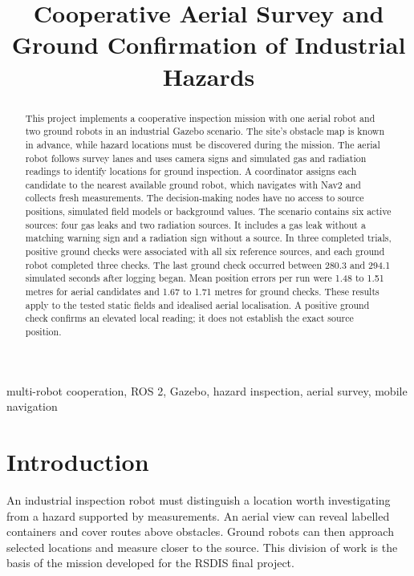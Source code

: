 \documentclass[conference]{IEEEtran}
\begin{document}
\title{Cooperative Aerial Survey and Ground Confirmation of Industrial Hazards}
\author{
}
\maketitle

\begin{abstract}
This project implements a cooperative inspection mission with one aerial robot and two ground robots in an industrial Gazebo scenario. The site's obstacle map is known in advance, while hazard locations must be discovered during the mission. The aerial robot follows survey lanes and uses camera signs and simulated gas and radiation readings to identify locations for ground inspection. A coordinator assigns each candidate to the nearest available ground robot, which navigates with Nav2 and collects fresh measurements. The decision-making nodes have no access to source positions, simulated field models or background values. The scenario contains six active sources: four gas leaks and two radiation sources. It includes a gas leak without a matching warning sign and a radiation sign without a source. In three completed trials, positive ground checks were associated with all six reference sources, and each ground robot completed three checks. The last ground check occurred between 280.3 and 294.1 simulated seconds after logging began. Mean position errors per run were 1.48 to 1.51 metres for aerial candidates and 1.67 to 1.71 metres for ground checks. These results apply to the tested static fields and idealised aerial localisation. A positive ground check confirms an elevated local reading; it does not establish the exact source position.
\end{abstract}
\begin{IEEEkeywords}
multi-robot cooperation, ROS 2, Gazebo, hazard inspection, aerial survey, mobile navigation
\end{IEEEkeywords}

\section{Introduction}
An industrial inspection robot must distinguish a location worth investigating from a hazard supported by measurements. An aerial view can reveal labelled containers and cover routes above obstacles. Ground robots can then approach selected locations and measure closer to the source. This division of work is the basis of the mission developed for the RSDIS final project.
\end{document}
